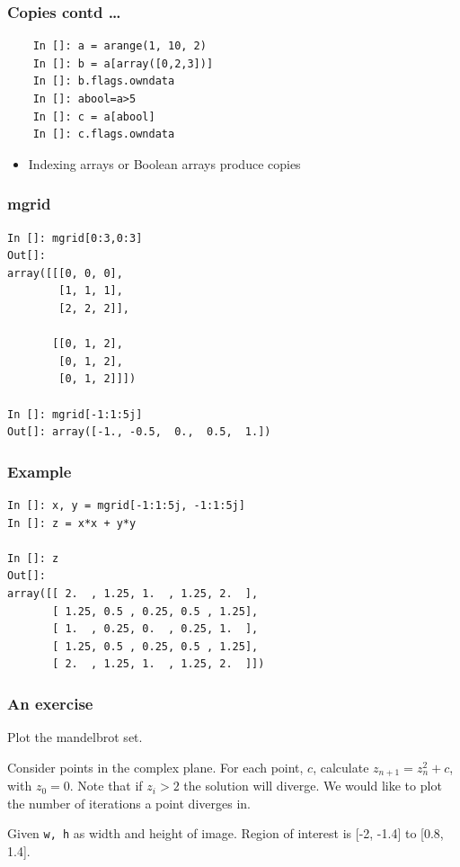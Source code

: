 \documentclass[14pt,compress]{beamer}
\newcounter{time}
\newcommand{\inctime}[1]{\addtocounter{time}{#1}{\tiny \thetime\ m}}
\newcommand{\typ}[1]{\lstinline{#1}}
\begin{document}
\begin{frame}[fragile]
  \frametitle{Copies contd \ldots}
  \begin{lstlisting}
    In []: a = arange(1, 10, 2)
    In []: b = a[array([0,2,3])]
    In []: b.flags.owndata
    In []: abool=a>5
    In []: c = a[abool]
    In []: c.flags.owndata
  \end{lstlisting}
  \begin{itemize}
  \item Indexing arrays or Boolean arrays produce copies
  \end{itemize}
\end{frame}

\begin{frame}[fragile]
  \frametitle{mgrid}
  \begin{lstlisting}
In []: mgrid[0:3,0:3]
Out[]: 
array([[[0, 0, 0],
        [1, 1, 1],
        [2, 2, 2]],

       [[0, 1, 2],
        [0, 1, 2],
        [0, 1, 2]]])

In []: mgrid[-1:1:5j]
Out[]: array([-1., -0.5,  0.,  0.5,  1.])
\end{lstlisting}
\end{frame}

\begin{frame}[fragile]
  \frametitle{Example}
  \begin{lstlisting}
In []: x, y = mgrid[-1:1:5j, -1:1:5j]
In []: z = x*x + y*y

In []: z
Out[]: 
array([[ 2.  , 1.25, 1.  , 1.25, 2.  ],
       [ 1.25, 0.5 , 0.25, 0.5 , 1.25],
       [ 1.  , 0.25, 0.  , 0.25, 1.  ],
       [ 1.25, 0.5 , 0.25, 0.5 , 1.25],
       [ 2.  , 1.25, 1.  , 1.25, 2.  ]])
\end{lstlisting}
\end{frame}


\begin{frame}[fragile]
  \frametitle{An exercise}

Plot the mandelbrot set. 

Consider points in the complex plane.  For each point, $c$, calculate
$z_{n+1} = z_n^2 + c$, with $z_0 = 0$.  Note that if $z_i > 2$ the
solution will diverge.  We would like to plot the number of iterations a
point diverges in.

Given \typ{w, h} as width and height of image.  Region of interest is
[-2, -1.4] to [0.8, 1.4].


\end{frame}
\end{document}
